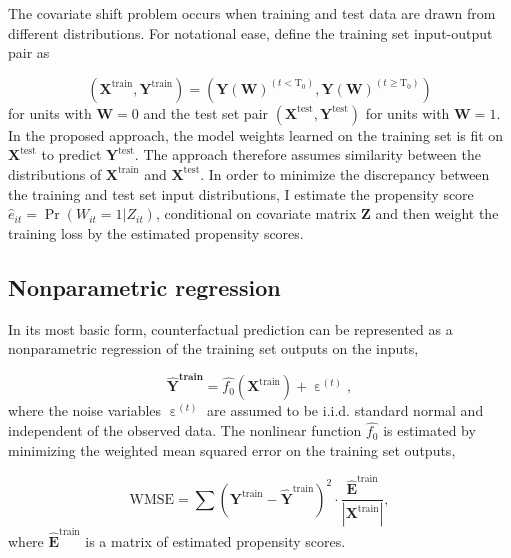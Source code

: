 \documentclass[hidelinks,12pt]{article}
\begin{document}
The covariate shift problem occurs when training and test data are drawn from different distributions. For notational ease, define the training set input-output pair as 

$$\left(\boldsymbol{X}^{\text{train}}, \boldsymbol{Y}^{\text{train}}\right) = \left(\boldsymbol{Y}(\boldsymbol{W})^{\left(t < \text{T}_0\right)}, \boldsymbol{Y}(\boldsymbol{W})^{\left(t \geq \text{T}_0\right)}\right)$$
\noindent
for units with $\boldsymbol{W}=0$ and the test set pair $\left(\boldsymbol{X}^{\text{test}}, \boldsymbol{Y}^{\text{test}}\right)$ for units with $\boldsymbol{W}=1$. In the proposed approach, the model weights learned on the training set is fit on $\boldsymbol{X}^{\text{test}}$ to predict $\boldsymbol{Y}^{\text{test}}$. The approach therefore assumes similarity between the distributions of $\boldsymbol{X}^{\text{train}}$ and $\boldsymbol{X}^{\text{test}}$. In order to minimize the discrepancy between the training and test set input distributions, I estimate the propensity score $\hat{e}_{it} = \Pr(W_{it}=1 | Z_{it})$, conditional on covariate matrix $\boldsymbol{Z}$ and then weight the training loss by the estimated propensity scores. 

\subsection{Nonparametric regression}

In its most basic form, counterfactual prediction can be represented as a nonparametric regression of the training set outputs on the inputs,

\begin{equation}\label{eq:np}
  \boldsymbol{\hat{\boldsymbol{Y}}^{\text{train}}} =  \hat{f_0} \left(\boldsymbol{X}^{\text{train}}\right) + \upepsilon^{(t)},
\end{equation}
\noindent
where the noise variables $\upepsilon^{(t)}$ are assumed to be i.i.d. standard normal and independent of the observed data. The nonlinear function $\hat{f_0}$ is estimated by minimizing the weighted mean squared error on the training set outputs, 

\begin{equation} \label{eq:mse}
\text{WMSE} = \sum \left(\boldsymbol{Y}^{\text{train}} - \boldsymbol{\hat{Y}}^{\text{train}}  \right)^2  \cdot \frac{\boldsymbol{\hat{E}}^\text{train}}{|\boldsymbol{X}^\text{train}|},
\end{equation}
\noindent
where $\boldsymbol{\hat{E}}^\text{train}$ is a matrix of estimated propensity scores. 
\end{document}
